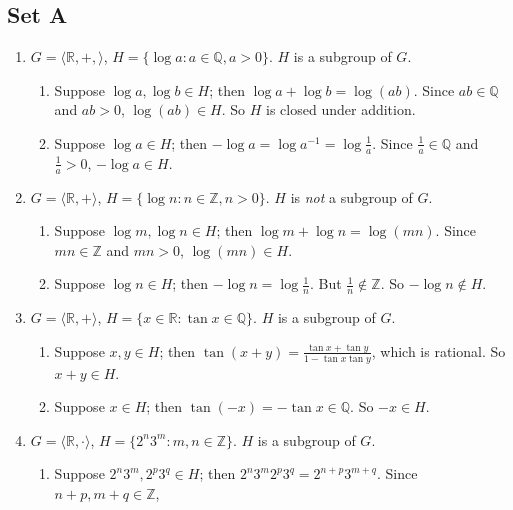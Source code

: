 \documentclass{article}
\begin{document}
\subsection*{Set A}
\begin{enumerate}
    \item $G = \langle \mathbb{R}, +, \rangle$, $H = \{\log a: a \in \mathbb{Q}, a > 0\}$. $H$ is a subgroup of $G$.
        \begin{enumerate}[label=(\roman*)]
            \item Suppose $\log a, \log b \in H$; then $\log a + \log b = \log(ab)$. Since $ab \in \mathbb{Q}$ and $ab > 0$, $\log(ab) \in H$. So $H$ is closed under addition.
            \item Suppose $\log a \in H$; then $-\log a = \log a^{-1} = \log \frac{1}{a}$. Since $ \frac{1}{a} \in \mathbb{Q}$ and $\frac{1}{a} > 0$, $-\log a \in H$.
        \end{enumerate}
    \item $G = \langle\mathbb{R}, +\rangle$, $H = \{\log n: n \in \mathbb{Z}, n > 0\}$. $H$ is \emph{not} a subgroup of $G$.
        \begin{enumerate}[label=(\roman*)]
            \item Suppose $\log m, \log n \in H$; then $\log m + \log n = \log(mn)$. Since $mn \in \mathbb{Z}$ and $mn > 0$, $\log(mn) \in H$.
            \item Suppose $\log n \in H$; then $-\log n = \log\frac{1}{n}$. But $\frac{1}{n} \notin \mathbb{Z}$. So $-\log n \notin H$.
        \end{enumerate}
    \item $G = \langle\mathbb{R}, +\rangle$, $H = \{x \in \mathbb{R}: \tan x \in \mathbb{Q}\}$. $H$ is a subgroup of $G$.
        \begin{enumerate}[label=(\roman*)]
            \item Suppose $x, y \in H$; then $\tan(x + y) = \frac{\tan x + \tan y}{1 - \tan x \tan y}$, which is rational. So $x + y \in H$.
            \item Suppose $x \in H$; then $\tan(-x) = -\tan x \in \mathbb{Q}$. So $-x \in H$.
        \end{enumerate}
    \item $G = \langle \mathbb{R}, \cdot \rangle$, $H = \{2^n3^m: m, n \in \mathbb{Z}\}$. $H$ is a subgroup of $G$.
        \begin{enumerate}[label=(\roman*)]
            \item Suppose $2^{n}3^{m}, 2^{p}3^{q} \in H$; then $2^{n}3^{m}2^{p}3^{q} = 2^{n + p}3^{m + q}$. Since $n + p, m + q \in \mathbb{Z}$,

\end{enumerate}
\end{enumerate}
\end{document}
